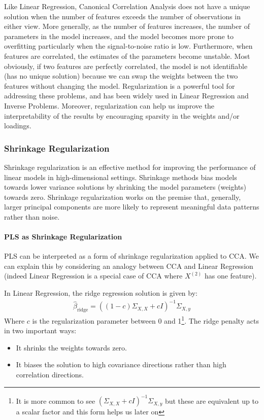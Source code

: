 Like Linear Regression, Canonical Correlation Analysis does not have a unique solution when the number of features exceeds the number of observations in either view.
More generally, as the number of features increases, the number of parameters in the model increases, and the model becomes more prone to overfitting particularly when the signal-to-noise ratio is low.
Furthermore, when features are correlated, the estimates of the parameters become unstable.
Most obviously, if two features are perfectly correlated, the model is not identifiable (has no unique solution) because we can swap the weights between the two features without changing the model.
Regularization is a powerful tool for addressing these problems, and has been widely used in Linear Regression and Inverse Problems.
Moreover, regularization can help us improve the interpretability of the results by encouraging sparsity in the weights and/or loadings.

\subsubsection{Shrinkage Regularization}

Shrinkage regularization is an effective method for improving the performance of linear models in high-dimensional settings.
Shrinkage methods bias models towards lower variance solutions by shrinking the model parameters (weights) towards zero.
Shrinkage regularization works on the premise that, generally, larger principal components are more likely to represent meaningful data patterns rather than noise.

\paragraph{PLS as Shrinkage Regularization}

PLS can be interpreted as a form of shrinkage regularization applied to CCA. We can explain this by considering an analogy between CCA and Linear Regression (indeed Linear Regression is a special case of CCA where \(X^{(2)}\) has one feature).

In Linear Regression, the ridge regression solution is given by:
\begin{align}
    \hat{\beta}_{\text{ridge}} = ((1-c)\Sigma_{X,X} + c I)^{-1} \Sigma_{X,y}
\end{align}
Where \(c\) is the regularization parameter between 0 and 1\footnote{It is more common to see $(\Sigma_{X,X} + c I)^{-1} \Sigma_{X,y}$ but these are equivalent up to a scalar factor and this form helps us later on}.
The ridge penalty acts in two important ways:
\begin{itemize}
    \item It shrinks the weights towards zero.
    \item It biases the solution to high covariance directions rather than high correlation directions.
\end{itemize}

